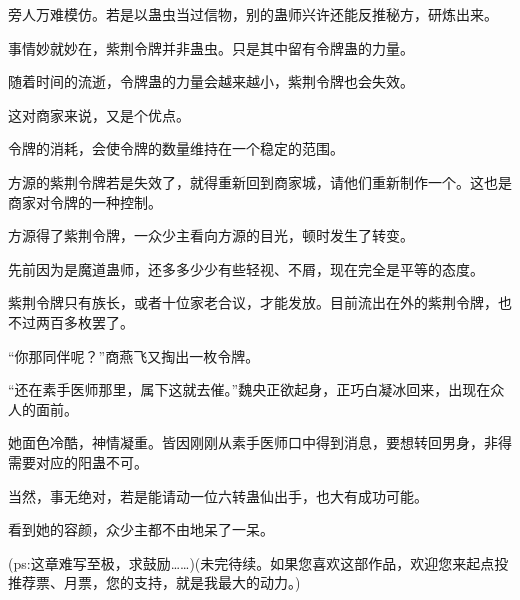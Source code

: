 \begin{this_body}
旁人万难模仿。若是以蛊虫当过信物，别的蛊师兴许还能反推秘方，研炼出来。

事情妙就妙在，紫荆令牌并非蛊虫。只是其中留有令牌蛊的力量。

随着时间的流逝，令牌蛊的力量会越来越小，紫荆令牌也会失效。

这对商家来说，又是个优点。

令牌的消耗，会使令牌的数量维持在一个稳定的范围。

方源的紫荆令牌若是失效了，就得重新回到商家城，请他们重新制作一个。这也是商家对令牌的一种控制。

方源得了紫荆令牌，一众少主看向方源的目光，顿时发生了转变。

先前因为是魔道蛊师，还多多少少有些轻视、不屑，现在完全是平等的态度。

紫荆令牌只有族长，或者十位家老合议，才能发放。目前流出在外的紫荆令牌，也不过两百多枚罢了。

“你那同伴呢？”商燕飞又掏出一枚令牌。

“还在素手医师那里，属下这就去催。”魏央正欲起身，正巧白凝冰回来，出现在众人的面前。

她面色冷酷，神情凝重。皆因刚刚从素手医师口中得到消息，要想转回男身，非得需要对应的阳蛊不可。

当然，事无绝对，若是能请动一位六转蛊仙出手，也大有成功可能。

看到她的容颜，众少主都不由地呆了一呆。

(ps:这章难写至极，求鼓励……)(未完待续。如果您喜欢这部作品，欢迎您来起点投推荐票、月票，您的支持，就是我最大的动力。)

\end{this_body}

